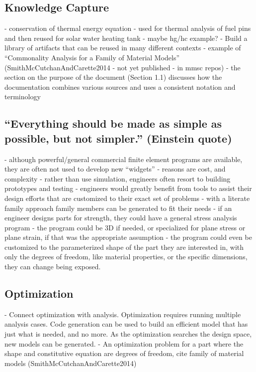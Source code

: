 \documentclass[10pt, preprint]{sigplanconf}
\begin{document}
\subsection{Knowledge Capture}
\label{subsec:knowledge}

- conservation of thermal energy equation - used for thermal analysis of fuel pins and then reused for solar water heating tank
- maybe hg/hc example?
- Build a library of artifacts that can be reused in many different contexts
- example of “Commonality Analysis for a Family of Material Models” (SmithMcCutchanAndCarette2014 - not yet published - in mmsc repos) - the section on the purpose of the document (Section 1.1) discusses how the documentation combines various sources and uses a consistent notation and terminology

\subsection{``Everything should be made as simple as possible, but not simpler.'' (Einstein quote)}
\label{subsec:everything}

- although powerful/general commercial finite element programs are available, they are often not used to develop new “widgets”
- reasons are cost, and complexity
- rather than use simulation, engineers often resort to building prototypes and testing
- engineers would greatly benefit from tools to assist their design efforts that are customized to their exact set of problems - with a literate family approach family members can be generated to fit their needs
- if an engineer designs parts for strength, they could have a general stress analysis program - the program could be 3D if needed, or specialized for plane stress or plane strain, if that was the appropriate assumption - the program could even be customized to the parameterized shape of the part they are interested in, with only the degrees of freedom, like material properties, or the specific dimensions, they can change being exposed.

\subsection{Optimization}
\label{subsec:optimization}

- Connect optimization with analysis.  Optimization requires running multiple analysis cases.  Code generation can be used to build an efficient model that has just what is needed, and no more.  As the optimization searches the design space, new models can be generated.
- An optimization problem for a part where the shape and constitutive equation are degrees of freedom, cite family of material models (SmithMcCutchanAndCarette2014)
\end{document}
